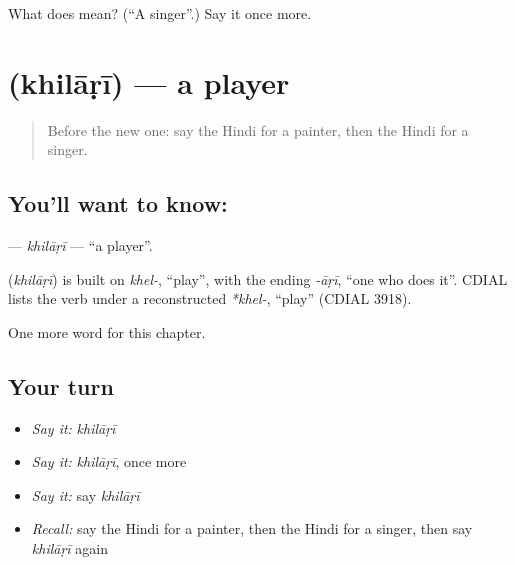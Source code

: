 \begin{tcolorbox}[breakable,colback=teal!4,colframe=teal!35!black,title={Before you move on}]
What does  mean? (\textquotedblleft{}A singer\textquotedblright{}.) Say it once more.
\end{tcolorbox}
\section[\texorpdfstring{\hi{खिलाड़ी} (khilāṛī)}{खिलाड़ी (khilāṛī)}]{ (khilāṛī) — a player}

\label{lesson:HI-C195-khilari}



\begin{quote}
Before the new one: say the Hindi for a painter, then the Hindi for a singer.
\end{quote}

\subsection*{You'll want to know: }
\textbf{} — \emph{khilāṛī} — \textquotedblleft{}a player\textquotedblright{}.

\begin{cousinweb}
\textbf{} (\emph{khilāṛī}) is built on \emph{khel-}, \textquotedblleft{}play\textquotedblright{}, with the ending \emph{-āṛī}, \textquotedblleft{}one who does it\textquotedblright{}. CDIAL lists the verb under a reconstructed \emph{*khel-}, \textquotedblleft{}play\textquotedblright{} (CDIAL 3918).
\end{cousinweb}

\begin{grammarlens}[title={What you've built}]
One more word for this chapter.
\end{grammarlens}

\subsection*{Your turn}
\begin{itemize}
\raggedright
  \item \emph{Say it:} \emph{khilāṛī}
  \item \emph{Say it:} \emph{khilāṛī}, once more
  \item \emph{Say it:} say \emph{khilāṛī}
  \item \emph{Recall:} say the Hindi for a painter, then the Hindi for a singer, then say \emph{khilāṛī} again
\end{itemize}


